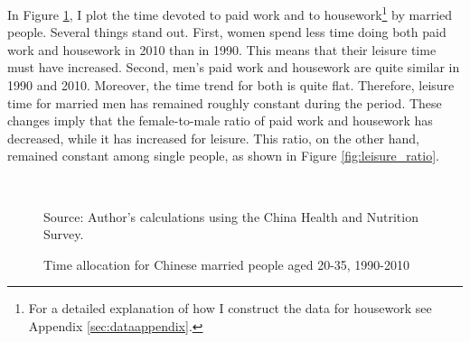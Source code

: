 \documentclass[12pt]{article}
\newcommand{\source}[1]{\caption*{Source: {#1}} }
\begin{document}
In Figure \ref{fig:time_use_married}, I plot the time devoted to paid work and to housework\footnote{For a detailed explanation of how I construct the data for housework see Appendix \ref{sec:dataappendix}.} by married people. Several things stand out. First, women spend less time doing both paid work and housework in 2010 than in 1990. This means that their leisure time must have increased. Second, men's paid work and housework are quite similar in 1990 and 2010. Moreover, the time trend for both is quite flat. Therefore, leisure time for married men has remained roughly constant during the period. These changes imply that the female-to-male ratio of paid work and housework has decreased, while it has increased for leisure. This ratio, on the other hand, remained constant among single people, as shown in Figure \ref{fig:leisure_ratio}. 

\begin{figure}[hp]
	\centering
	\caption{Time allocation for Chinese married people aged 20-35, 1990-2010}\label{fig:time_use_married}
	\\
	\source{Author's calculations using the China Health and Nutrition Survey.}
\end{figure}
\end{document}
